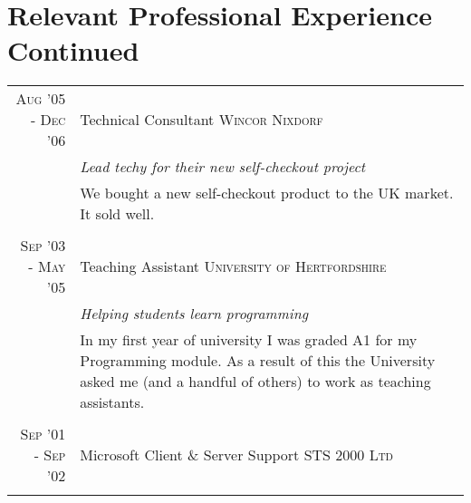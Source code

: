 \documentclass[a4paper,11pt]{article}
\begin{document}
\section{Relevant Professional Experience Continued}
\begin{tabular}{r|p{11.2cm}}
  \textsc{Aug '05 - Dec '06} & Technical Consultant \textsc{Wincor Nixdorf}\\
                             &\emph{Lead techy for their new self-checkout project }\\
                             &\footnotesize{We bought a new self-checkout product to the UK market.
It sold well.}
  \\\multicolumn{2}{c}{} \\
  \textsc{Sep '03 - May '05} & Teaching Assistant \textsc{University of Hertfordshire}\\
                             &\emph{Helping students learn programming }\\
                             &\footnotesize{In my first year of university I was graded A1 for my Programming module. As
  a result of this the University asked me (and a handful of others) to work as teaching assistants. }
  \\\multicolumn{2}{c}{} \\
  \textsc{Sep '01 - Sep '02} & Microsoft Client \& Server Support \textsc{STS 2000 Ltd}
  \\\multicolumn{2}{c}{} \\
\end{tabular}
\end{document}

